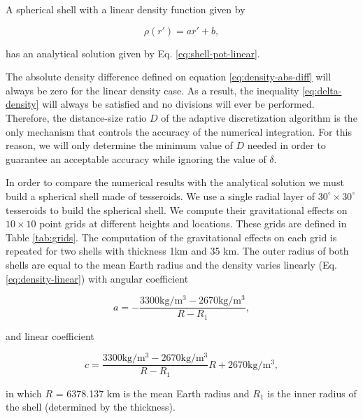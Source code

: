 \documentclass[extra]{gji}
\begin{document}
A spherical shell with a linear density function given by

\begin{equation}
    \rho(r') = ar' + b,
    \label{eq:density-linear}
\end{equation}

\noindent
has an analytical solution given by Eq. \ref{eq:shell-pot-linear}.

The absolute density difference defined on equation
\ref{eq:density-abs-diff} will always be zero for the linear density case.
As a result, the inequality \ref{eq:delta-density} will always be satisfied and no
divisions will ever be performed.
Therefore, the distance-size ratio $D$ of the adaptive discretization algorithm is the
only mechanism that controls the accuracy of the numerical integration.
For this reason, we will only determine the minimum value of $D$ needed in order to
guarantee an acceptable accuracy while ignoring the value of $\delta$.

In order to compare the numerical results with the analytical solution we
must build a spherical shell made of tesseroids.
We use a single radial layer of $30^\circ \times 30^\circ$ tesseroids to
build the spherical shell.
We compute their gravitational effects on $10 \times 10$ point grids at
different heights and locations.
These grids are defined in Table \ref{tab:grids}.
The computation of the gravitational effects on each grid is repeated for
two shells with thickness 1km and 35 km.
The outer radius of both shells are equal to the mean Earth radius and
the density varies linearly (Eq. \ref{eq:density-linear})
with angular coefficient

\begin{equation}
    a = -\frac{3300\text{kg/m$^3$} - 2670\text{kg/m$^3$}}{R - R_1},
\end{equation}

\noindent and linear coefficient

\begin{equation}
    c = \frac{3300\text{kg/m$^3$} -
        2670\text{kg/m$^3$}}{R - R_1} R +
        2670\text{kg/m$^3$},
\end{equation}

\noindent
in which $R$ = 6378.137 km is the mean Earth radius and $R_1$ is the inner radius of the
shell (determined by the thickness).
\end{document}
